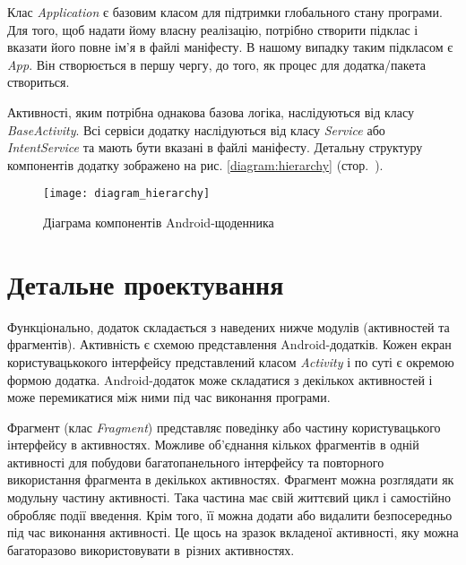 \documentclass[../main.tex]{subfiles}
\begin{document}
Клас \textit{Application} є базовим класом для підтримки глобального стану програми. Для того, щоб надати йому власну реалізацію, потрібно створити підклас і вказати його повне ім'я в файлі маніфесту. В нашому випадку таким підкласом є \textit{App}. Він створюється в першу чергу, до того, як процес для додатка/пакета створиться.

Активності, яким потрібна однакова базова логіка, наслідуються від класу \textit{BaseActivity}. Всі сервіси додатку наслідуються від класу \textit{Service} або \textit{IntentService} та мають бути вказані в файлі маніфесту. Детальну структуру компонентів додатку зображено на рис. \ref{diagram:hierarchy} (стор.~\pageref{diagram:hierarchy}).

\begin{figure}[p]
	\centering
	\texttt{[image: diagram\_hierarchy]}
	\caption{Діаграма компонентів Android-щоденника}
\end{figure}

\section{Детальне проектування}

Функціонально, додаток складається з наведених нижче модулів (активностей та фрагментів). Активність є схемою представлення Android-додатків. Кожен екран користувацькокого інтерфейсу представлений класом \textit{Activity} і по суті є окремою формою додатка. Android-додаток може складатися з декількох активностей і може перемикатися між ними під час виконання програми. 

Фрагмент (клас \textit{Fragment}) представляє поведінку або частину користувацького інтерфейсу в активностях. Можливе об'єднання кількох фрагментів в одній активності для побудови багатопанельного інтерфейсу та повторного використання фрагмента в декількох активностях. Фрагмент можна розглядати як модульну частину активності. Така частина має свій життєвий цикл і самостійно обробляє події введення. Крім того, її можна додати або видалити безпосередньо під час виконання активності. Це щось на зразок вкладеної активності, яку можна багаторазово використовувати в~різних активностях.
\end{document}

